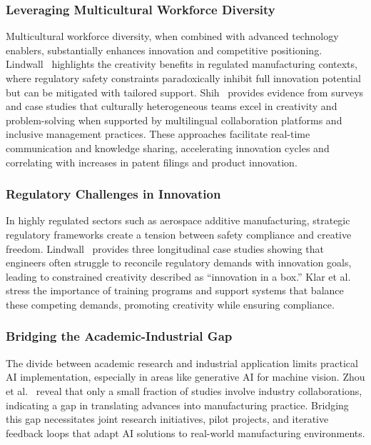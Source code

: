 \documentclass[sigconf]{acmart}
\begin{document}
\subsubsection*{Leveraging Multicultural Workforce Diversity}

Multicultural workforce diversity, when combined with advanced technology enablers, substantially enhances innovation and competitive positioning. Lindwall~\cite{ref16} highlights the creativity benefits in regulated manufacturing contexts, where regulatory safety constraints paradoxically inhibit full innovation potential but can be mitigated with tailored support. Shih~\cite{ref17} provides evidence from surveys and case studies that culturally heterogeneous teams excel in creativity and problem-solving when supported by multilingual collaboration platforms and inclusive management practices. These approaches facilitate real-time communication and knowledge sharing, accelerating innovation cycles and correlating with increases in patent filings and product innovation.

\subsubsection*{Regulatory Challenges in Innovation}

In highly regulated sectors such as aerospace additive manufacturing, strategic regulatory frameworks create a tension between safety compliance and creative freedom. Lindwall~\cite{ref16} provides three longitudinal case studies showing that engineers often struggle to reconcile regulatory demands with innovation goals, leading to constrained creativity described as “innovation in a box.” Klar et al.~\cite{ref9} stress the importance of training programs and support systems that balance these competing demands, promoting creativity while ensuring compliance.

\subsubsection*{Bridging the Academic-Industrial Gap}

The divide between academic research and industrial application limits practical AI implementation, especially in areas like generative AI for machine vision. Zhou et al.~\cite{ref3} reveal that only a small fraction of studies involve industry collaborations, indicating a gap in translating advances into manufacturing practice. Bridging this gap necessitates joint research initiatives, pilot projects, and iterative feedback loops that adapt AI solutions to real-world manufacturing environments.
\end{document}
